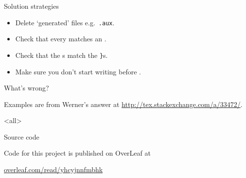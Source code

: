\begin{frame}{Solution strategies}
	\begin{itemize}
		\item Delete ‘generated’ files e.g.\ \texttt{.aux}.
		\item Check that every  matches an .
		\item Check that the \textt{\{}s match the \texttt{\}}s.
		\item Make sure you don't start writing before .
	\end{itemize}

\end{frame}

\begin{exercise}
What's wrong?





Examples are from Werner's answer at \url{http://tex.stackexchange.com/a/33472/}.

\end{exercise}





\mode<all>
\mode*

\begin{frame}{Source code}

  \begin{center}
     Code for this project is published on OverLeaf at\bigskip

    \url{overleaf.com/read/yhcyjnnfmbhk}
  \end{center}

\end{frame}



